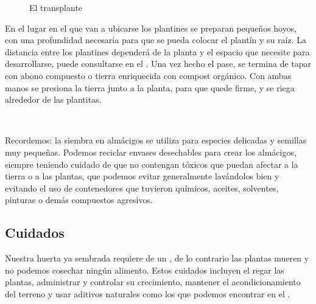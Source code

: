 \documentclass[../main.tex]{subfiles}
\begin{document}
\begin{wrapfigure}[12]{i}[0cm]{0.45\textwidth}
    \centering
    \caption*{\color{CompostGreen!50!black}El transplante}
    \label{transplante1}
\end{wrapfigure}


En el lugar en el que van a ubicarse los plantines se preparan pequeños hoyos, con una profundidad necesaria para que se pueda colocar el plantín y su raíz. La distancia entre los plantines dependerá de la planta y el espacio que necesite para desarrollarse, puede consultarse en el .
Una vez hecho el pase, se termina de tapar con abono compuesto o tierra enriquecida con compost orgánico. Con ambas manos se presiona la tierra junto a la planta, para que quede firme, y se riega alrededor de las plantitas.

\hfill\\

\begin{recuadroV}
    Recordemos: la siembra en almácigos se utiliza para especies delicadas y semillas muy pequeñas. Podemos reciclar envases desechables para crear los almácigos, siempre teniendo cuidado de que no contengan tóxicos que puedan afectar a la tierra o a las plantas, que podemos evitar generalmente lavándolos bien y evitando el uso de contenedores que tuvieron químicos, aceites, solventes, pinturas o demás compuestos agresivos.
\end{recuadroV}

\subsection{Cuidados}

Nuestra huerta ya sembrada requiere de un , de lo contrario las plantas mueren y no podemos cosechar ningún alimento. Estos cuidados incluyen el regar las plantas, administrar y controlar su crecimiento, mantener el acondicionamiento del terreno y usar aditivos naturales como los que podemos encontrar en el .
\end{document}
